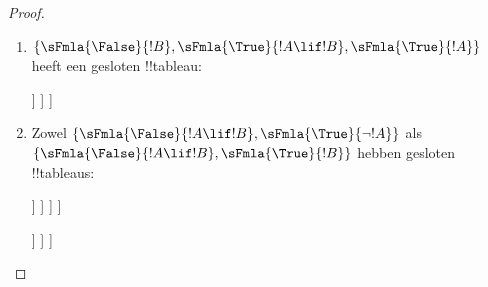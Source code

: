 \documentclass[openany]{memoir}
\begin{document}
\begin{proof}
  \begin{enumerate}
    \item $\{\sFmla{\False}{!B}, \sFmla{\True}{!A \lif !B},
      \sFmla{\True}{!A}\}$ heeft een gesloten !!{tableau}:
      \begin{oltableau}
        [\sFmla{\False}{\formula{B}}, just=\TAss
          [\sFmla{\True}{\formula{A} \lif \formula{B}}, just=\TAss
            [\sFmla{\True}{\formula{A}}, just=\TAss
              [\sFmla{\False}{\formula{A}}, just = {\TRule{\True}{\lif}[2]}, close]
              [\sFmla{\True}{\formula{B}}, just = {\TRule{\True}{\lif}[2]}, close]
            ]
          ]
        ]
      \end{oltableau}
    \item Zowel $\{\sFmla{\False}{!A \lif !B},
      \sFmla{\True}{\lnot !A}\}$ als $\{\sFmla{\False}{!A \lif !B},
      \sFmla{\True}{!B}\}$ hebben gesloten !!{tableau}s:
      \begin{oltableau}
        [\sFmla{\False}{\formula{A} \lif \formula{B}}, just = \TAss
          [\sFmla{\True}{\lnot \formula{A}}, just = \TAss
            [\sFmla{\True}{\formula{A}}, just = {\TRule{\False}{\lif}[1]}
              [\sFmla{\False}{\formula{B}}, just = {\TRule{\False}{\lif}[1]}
                [\sFmla{\False}{\formula{A}}, just = {\TRule{\True}{\lnot}[2]}, close]
              ]
            ]
          ]
        ]
      \end{oltableau}
      \begin{oltableau}
        [\sFmla{\False}{\formula{A} \lif \formula{B}}, just = \TAss
          [\sFmla{\True}{\formula{B}}, just = \TAss
            [\sFmla{\True}{\formula{A}}, just = {\TRule{\False}{\lif}[1]}
              [\sFmla{\False}{\formula{B}}, just = {\TRule{\False}{\lif}[1]},close
              ]
            ]
          ]
        ]
      \end{oltableau}
  \end{enumerate}
\end{proof}
\endgroup

\begingroup
\def\olfilename{OLP-0108}
\def\olfilepath{content/first-order-logic/tableaux/}
\hypertarget{unit-OLP-0108}{}
\end{document}
